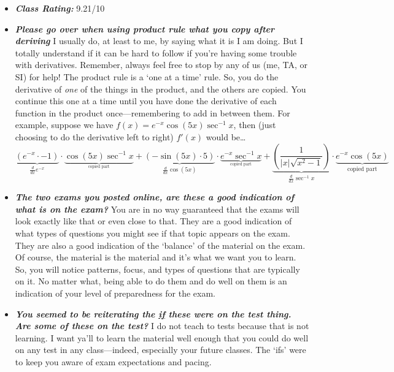\documentclass[11pt,letterpaper]{article}
\begin{document}
\begin{itemize}
\item {\bfseries\itshape Class Rating:} 9.21/10
\item {\bfseries\itshape Please go over when using product rule what you copy after deriving} I usually do, at least to me, by saying what it is I am doing. But I totally understand if it can be hard to follow if you're having some trouble with derivatives. Remember, always feel free to stop by any of us (me, TA, or SI) for help! The product rule is a `one at a time' rule. So, you do the derivative of \textit{one} of the things in the product, and the others are copied. You continue this one at a time until you have done the derivative of each function in the product once---remembering to add in between them. For example, suppose we have $f(x)= e^{-x} \cos(5x) \sec^{-1} x$, then (just choosing to do the derivative left to right) $f'(x)$ would be\dots
	\[
	\underbrace{(e^{-x} \cdot -1)}_{\tfrac{d}{dx} e^{-x}} \cdot \underbrace{\cos(5x) \sec^{-1} x}_{_{\text{copied part}}} + \underbrace{(-\sin(5x) \cdot 5)}_{\tfrac{d}{dx} \cos(5x)} \cdot \underbrace{e^{-x} \sec^{-1} x}_{_{\text{copied part}}} + \underbrace{\left( \dfrac{1}{|x| \sqrt{x^2 - 1}} \right)}_{\tfrac{d}{dx} \sec^{-1} x} \cdot \underbrace{e^{-x} \cos(5x)}_{\text{copied part}}
	\]

\item {\bfseries\itshape The two exams you posted online, are these a good indication of what is on the exam?} You are in no way guaranteed that the exams will look exactly like that or even close to that. They are a good indication of what types of questions you might see if that topic appears on the exam. They are also a good indication of the `balance' of the material on the exam. Of course, the material is the material and it's what we want you to learn. So, you will notice patterns, focus, and types of questions that are typically on it. No matter what, being able to do them and do well on them is an indication of your level of preparedness for the exam. 

\item {\bfseries\itshape You seemed to be reiterating the \underline{if} these were on the test thing. Are some of these on the test?} I do not teach to tests because that is not learning. I want ya'll to learn the material well enough that you could do well on any test in any class---indeed, especially your future classes. The `ifs' were to keep you aware of exam expectations and pacing. 


\end{itemize}
\end{document}
